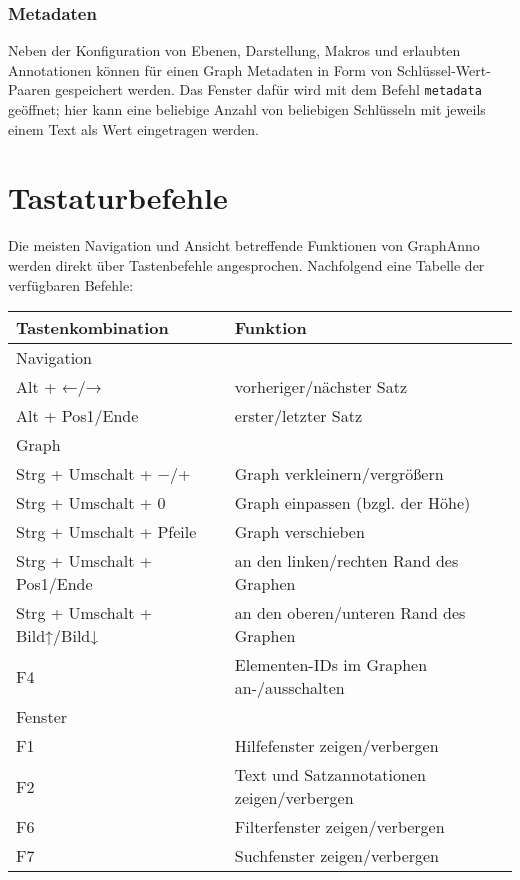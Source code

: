 \documentclass[12pt]{scrartcl}
\begin{document}
\subsubsection{Metadaten}

Neben der Konfiguration von Ebenen, Darstellung, Makros und erlaubten Annotationen können für einen Graph Metadaten in Form von Schlüssel-Wert-Paaren gespeichert werden. Das Fenster dafür wird mit dem Befehl \texttt{metadata} geöffnet; hier kann eine beliebige Anzahl von beliebigen Schlüsseln mit jeweils einem Text als Wert eingetragen werden.



\section{Tastaturbefehle}

Die meisten Navigation und Ansicht betreffende Funktionen von GraphAnno werden direkt über Tastenbefehle angesprochen. Nachfolgend eine Tabelle der verfügbaren Befehle:

\begin{center}
	\begin{tabular*}{\textwidth}{ll}
		\toprule
		Tastenkombination & Funktion \\
		\midrule
		Navigation & \\
		\midrule
			Alt + ←/→ & vorheriger/nächster Satz \\
			Alt + Pos1/Ende & erster/letzter Satz \\
		\midrule
		Graph & \\
		\midrule
			Strg + Umschalt + −/+ & Graph verkleinern/vergrößern \\
			Strg + Umschalt + 0 & Graph einpassen (bzgl. der Höhe) \\
			Strg + Umschalt + Pfeile & Graph verschieben \\
			Strg + Umschalt + Pos1/Ende & an den linken/rechten Rand des Graphen \\
			Strg + Umschalt + Bild↑/Bild↓ & an den oberen/unteren Rand des Graphen \\
			F4 & Elementen-IDs im Graphen an-/ausschalten\\
		\midrule
		Fenster & \\
		\midrule
			F1 & Hilfefenster zeigen/verbergen\\
			F2 & Text und Satzannotationen zeigen/verbergen\\
			F6 & Filterfenster zeigen/verbergen\\
			F7 & Suchfenster zeigen/verbergen\\
		\bottomrule
	\end{tabular*}
\end{center}
\end{document}
